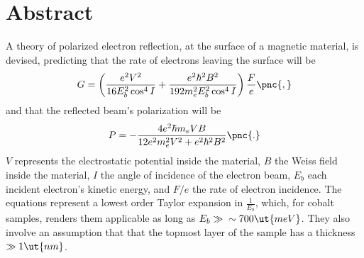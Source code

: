 \chapter*{Abstract}

A theory of polarized electron reflection, at the surface of a
magnetic material, is devised, predicting that the rate of electrons
leaving the surface will be
\begin{equation}
G = \left(\frac{e^2V^2}{16E_b^2\cos^4I}+\frac{e^2\hbar^2B^2}{192m_e^2E_b^2\cos^4I}\right)\frac{F}{e}\pnc{,}
\end{equation}
and that the reflected beam's polarization will be
\begin{equation}
P =
-\frac{4e^2\hbar{}m_eVB}{12e^2m_e^2V^2+e^2\hbar^2B^2}\pnc{.}
\end{equation}
$V$ represents the electrostatic potential inside the material, $B$
the Weiss field inside the material, $I$ the angle of incidence of the
electron beam, $E_b$ each incident electron's kinetic energy, and
$F/e$ the rate of electron incidence.  The equations represent a
lowest order Taylor expansion in $\frac{1}{E_b}$, which, for cobalt
samples, renders them applicable as long as $E_b \gg{}
\sim{}700\ut{meV}$.  They also involve an assumption that that the
topmost layer of the sample has a thickness $\gg{} 1\ut{nm}$.

